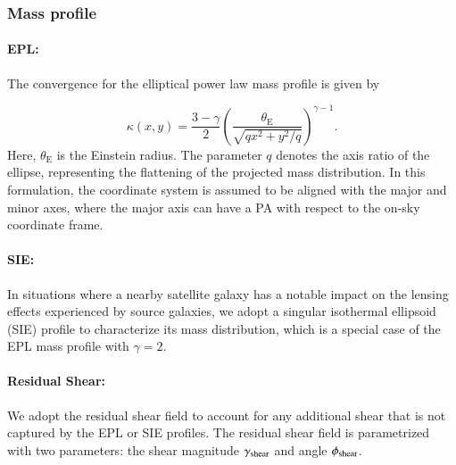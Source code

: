 \documentclass{aa}
\begin{document}
\subsubsection{Mass profile} \label{sec:mass_profile}
\paragraph{\textbf{EPL:}}
 The convergence for the elliptical power law \citep[EPL;][]{Tessore15} mass profile is given by

 \begin{equation}
\kappa\left(x, y\right)=\frac{3-\gamma}{2}\left(\frac{\theta_{\mathrm{E}}}{\sqrt{q x^2+y^2 / q}}\right)^{\gamma-1}.
\end{equation}    
%
Here, \(\theta_{\mathrm{E}}\) is the Einstein radius. The parameter \(q\) denotes the axis ratio of the ellipse, representing the flattening of the projected mass distribution. In this formulation, the coordinate system is assumed to be aligned with the major and minor axes, where the major axis can have a PA with respect to the on-sky coordinate frame.

\paragraph{\textbf{SIE:}} In situations where a nearby satellite galaxy has a notable impact on the lensing effects experienced by source galaxies, we adopt a singular isothermal ellipsoid (SIE) profile to characterize its mass distribution, which is a special case of the EPL mass profile with \(\gamma=2\).

\paragraph{\textbf{Residual Shear:}} We adopt the residual shear field to account for any additional shear that is not captured by the EPL or SIE profiles. %
The residual shear field is parametrized with two parameters: the shear magnitude $\gamma_{\rm shear}$ and angle $\phi_{\rm shear}$.
\end{document}

